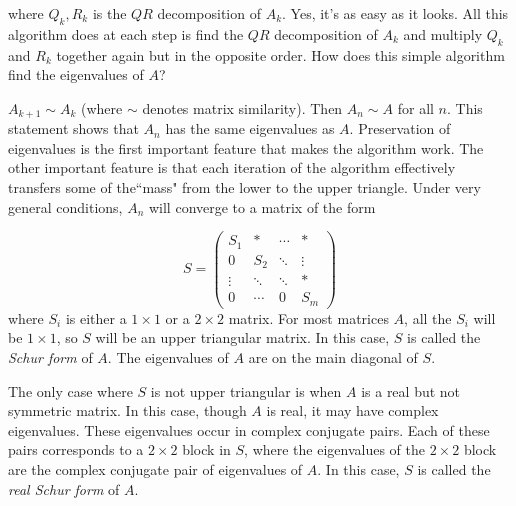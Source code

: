 where $Q_k, R_k$ is the $QR$ decomposition of $A_k$. Yes, it's as easy as it looks. All this algorithm does at each step is find the $QR$ decomposition of $A_k$ and multiply $Q_k$ and $R_k$ together again but in the opposite order. How does this simple algorithm find the eigenvalues of $A$? 

  

\begin{comment}
\begin{problem}
\label{problem:similarity proof}
Prove that $A_{k+1} \sim A_k$ (where $\sim$ denotes matrix similarity). Then prove that $A_n \sim A$ for all $n$.  
\end{problem}
\end{comment}

$A_{k+1} \sim A_k$ (where $\sim$ denotes matrix similarity). Then $A_n \sim A$ for all $n$. This statement shows that $A_n$ has the same eigenvalues as $A$. Preservation of eigenvalues is the first important feature that makes the algorithm work. The other important feature is that each iteration of the algorithm effectively transfers some of the``mass" from the lower to the upper triangle. Under very general conditions, $A_n$ will converge to a matrix of the form

\begin{equation}
\label{eq:Schur form}
S = 
     \begin{pmatrix}
          S_1 &* & \cdots & * \\
           0     &S_2  &  \ddots & \vdots \\
           \vdots  & \ddots & \ddots & *  \\
           0 & \cdots & 0 & S_m
    \end{pmatrix}
\end{equation}
where $S_i$ is either a $1 \times 1$ or a $2 \times 2$ matrix. For most matrices $A$, all the $S_i$ will be $1 \times 1$, so $S$ will be an upper triangular matrix. In this case, $S$ is called the \emph{Schur form} of $A$. The eigenvalues of $A$ are on the main diagonal of $S$.

The only case where $S$ is not upper triangular is when $A$ is a real but not symmetric matrix. In this case, though $A$ is real, it may have complex eigenvalues. These eigenvalues occur in complex conjugate pairs. Each of these pairs corresponds to a $2 \times 2$ block in $S$, where the eigenvalues of the $2 \times 2$ block are the complex conjugate pair of eigenvalues of $A$. In this case, $S$ is called the \emph{real Schur form} of $A$.

